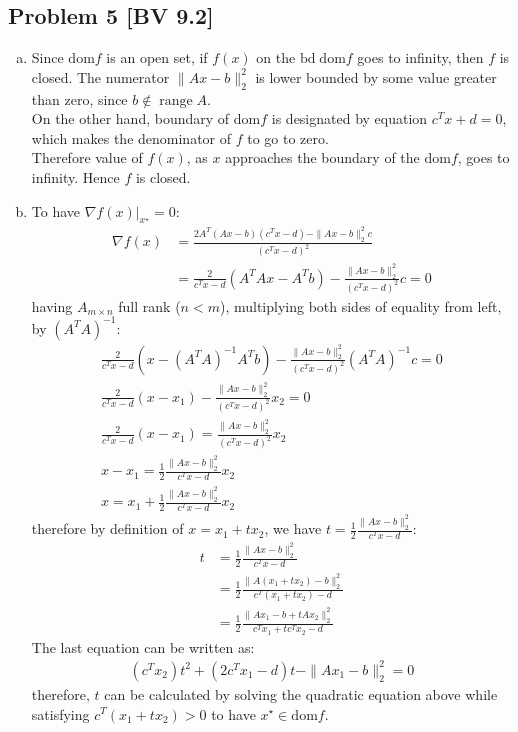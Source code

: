 \documentclass[12pt, letterpaper, twoside]{article}
\DeclareMathOperator{\Range}{range}
\begin{document}
\subsection*{Problem 5 \small[BV 9.2]} 
\begin{enumerate}[(a)]
    \item Since $\mathrm{dom}f$ is an open set, if $f(x)$ on the $\mathrm{bd}\;\mathrm{dom}f$ goes to infinity, then $f$ is closed. The numerator $\|Ax-b\|_2^2$ is lower bounded by some value greater than zero, since $b\notin\Range A$.\\On the other hand, boundary of $\mathrm{dom}f$ is designated by equation $c^Tx+d=0$, which makes the denominator of $f$ to go to zero.\\
    Therefore value of $f(x)$, as $x$ approaches the boundary of the $\mathrm{dom}f$, goes to infinity. Hence $f$ is closed.

    \item To have $\left.\nabla f(x)\right\vert_{x^\star}=0$:
    \begin{align*}
        \nabla f(x)
        &=\frac{2A^T(Ax-b)(c^Tx-d)-\|Ax-b\|_2^2c}{(c^Tx-d)^2}\\
        &=\frac{2}{c^Tx-d}(A^TAx-A^Tb)-\frac{\|Ax-b\|_2^2}{(c^Tx-d)^2}c=0
    \end{align*}
    having $A_{m\times n}$ full rank ($n<m$), multiplying both sides of equality from left, by $(A^TA)^{-1}$:
    \begin{align*}
        \frac{2}{c^Tx-d}(x-(A^TA)^{-1}A^Tb)-\frac{\|Ax-b\|_2^2}{(c^Tx-d)^2}(A^TA)^{-1}c=0\\
        \frac{2}{c^Tx-d}(x-x_1)-\frac{\|Ax-b\|_2^2}{(c^Tx-d)^2}x_2=0\\
        \frac{2}{c^Tx-d}(x-x_1)=\frac{\|Ax-b\|_2^2}{(c^Tx-d)^2}x_2\\
        x-x_1=\frac{1}{2}\frac{\|Ax-b\|_2^2}{c^Tx-d}x_2\\
        x=x_1+\frac{1}{2}\frac{\|Ax-b\|_2^2}{c^Tx-d}x_2
    \end{align*}
    therefore by definition of $x=x_1+tx_2$, we have $t=\frac{1}{2}\frac{\|Ax-b\|_2^2}{c^Tx-d}$:
    \begin{align*}
        t&=\frac{1}{2}\frac{\|Ax-b\|_2^2}{c^Tx-d}\\
        &=\frac{1}{2}\frac{\|A(x_1+tx_2)-b\|_2^2}{c^T(x_1+tx_2)-d}\\
        &=\frac{1}{2}\frac{\|Ax_1-b+tAx_2\|_2^2}{c^Tx_1+tc^Tx_2-d}
    \end{align*}
    The last equation can be written as:
    \begin{align*}
        (c^Tx_2)t^2+(2c^Tx_1-d)t-\|Ax_1-b\|_2^2=0
    \end{align*}
    therefore, $t$ can be calculated by solving the quadratic equation above while satisfying $c^T(x_1+tx_2)>0$ to have $x^\star\in\mathrm{dom}f$.
\end{enumerate}
\end{document}
